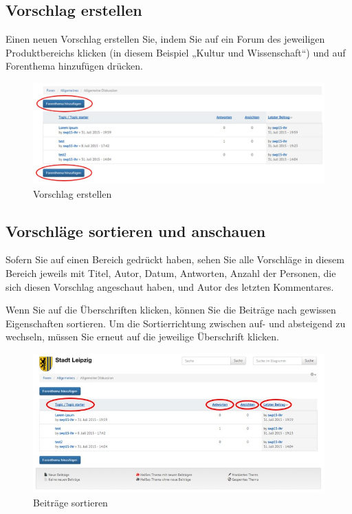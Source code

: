 \documentclass[a4paper,11pt,twoside]{article}
\begin{document}
\subsection{Vorschlag erstellen} \label{vorschlag}
Einen neuen Vorschlag erstellen Sie, indem Sie auf ein Forum des jeweiligen
Produktbereichs klicken (in diesem Beispiel „Kultur und Wissenschaft“) und auf
Forenthema hinzuf\"ugen dr\"ucken.

\begin{figure}[ht]
\begin{center}
  \includegraphics[width=\textwidth]{Bilder/forumtopic.jpg}
\end{center}
  \caption{Vorschlag erstellen}
\end{figure}

\subsection{Vorschl\"age sortieren und anschauen}
Sofern Sie auf einen Bereich gedr\"uckt haben, sehen Sie alle Vorschl\"age in
diesem Bereich jeweils mit Titel, Autor, Datum, Antworten, Anzahl der
Personen, die sich diesen Vorschlag angeschaut haben, und Autor des letzten
Kommentares.

Wenn Sie auf die Überschriften klicken, k\"onnen Sie die Beitr\"age nach
gewissen Eigenschaften sortieren. Um die Sortierrichtung zwischen auf- und
absteigend zu wechseln, müssen Sie erneut auf die jeweilige Überschrift
klicken.

\begin{figure}[ht]
\begin{center}
  \includegraphics[width=\textwidth]{Bilder/forumsort.jpg}
\end{center}
  \caption{Beiträge sortieren}
\end{figure}
\end{document}
